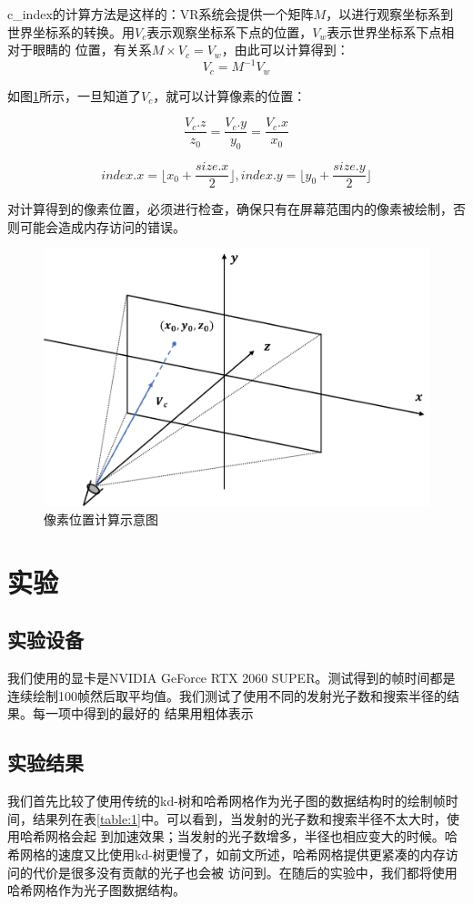 \documentclass[UTF8]{ctexart}
\begin{document}
        c\_index的计算方法是这样的：VR系统会提供一个矩阵$M$，以进行观察坐标系到世界坐标系的转换。用$V_{c}$表示观察坐标系下点的位置，$V_{w}$表示世界坐标系下点相对于眼睛的
        位置，有关系$M\times V_{c}=V_{w}$，由此可以计算得到：
        $$V_{c}=M^{-1}V_{w}$$
        
        如图\ref{fig:4}所示，一旦知道了$V_{c}$，就可以计算像素的位置：
        
        $$\frac{V_c.z}{z_0}=\frac{V_c.y}{y_0}=\frac{V_c.x}{x_0}$$
        
        $$index.x=\lfloor x_0+\frac{size.x}{2} \rfloor,index.y=\lfloor y_0+\frac{size.y}{2} \rfloor$$
        
        对计算得到的像素位置，必须进行检查，确保只有在屏幕范围内的像素被绘制，否则可能会造成内存访问的错误。
        
        \begin{figure}[htbp]
        \centering
        \includegraphics[scale=0.6]{pic/IndexCalculation.png}
        \caption{像素位置计算示意图}
        \label{fig:4}
        \end{figure}
\section{实验}
    \subsection{实验设备}
        我们使用的显卡是NVIDIA GeForce RTX 2060 SUPER。测试得到的帧时间都是连续绘制100帧然后取平均值。我们测试了使用不同的发射光子数和搜索半径的结果。每一项中得到的最好的
        结果用粗体表示
    \subsection{实验结果}
        我们首先比较了使用传统的kd-树和哈希网格作为光子图的数据结构时的绘制帧时间，结果列在表\ref{table:1}中。可以看到，当发射的光子数和搜索半径不太大时，使用哈希网格会起
        到加速效果；当发射的光子数增多，半径也相应变大的时候。哈希网格的速度又比使用kd-树更慢了，如前文所述，哈希网格提供更紧凑的内存访问的代价是很多没有贡献的光子也会被
        访问到。在随后的实验中，我们都将使用哈希网格作为光子图数据结构。
        
\end{document}
